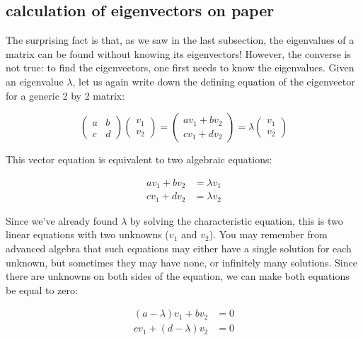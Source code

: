 \documentclass[
  letterpaper,
  DIV=11,
  numbers=noendperiod]{scrreprt}
\begin{document}
\hypertarget{calculation-of-eigenvectors-on-paper}{%
\subsection{calculation of eigenvectors on
paper}\label{calculation-of-eigenvectors-on-paper}}

The surprising fact is that, as we saw in the last subsection, the
eigenvalues of a matrix can be found without knowing its eigenvectors!
However, the converse is not true: to find the eigenvectors, one first
needs to know the eigenvalues. Given an eigenvalue \(\lambda\), let us
again write down the defining equation of the eigenvector for a generic
2 by 2 matrix:

\[
\left(\begin{array}{cc}a & b \\c & d\end{array}\right)\left(\begin{array}{c}v_1 \\ v_2 \end{array}\right) = \left(\begin{array}{c}av_1 +b v_2\\ cv_1+ dv_2 \end{array}\right) = \lambda \left(\begin{array}{c}v_1 \\ v_2 \end{array}\right)
\]

This vector equation is equivalent to two algebraic equations:

\[
\begin{aligned}
av_1 + b v_2 &= \lambda v_1 \\
cv_1 + d v_2 &= \lambda v_2 
\end{aligned}
\]

Since we've already found \(\lambda\) by solving the characteristic
equation, this is two linear equations with two unknowns (\(v_1\) and
\(v_2\)). You may remember from advanced algebra that such equations may
either have a single solution for each unknown, but sometimes they may
have none, or infinitely many solutions. Since there are unknowns on
both sides of the equation, we can make both equations be equal to zero:

\[\begin{aligned}
(a-\lambda)v_1 + b v_2 &= 0 \\
cv_1 + (d-\lambda ) v_2 &=0
\end{aligned}
\]
\end{document}
